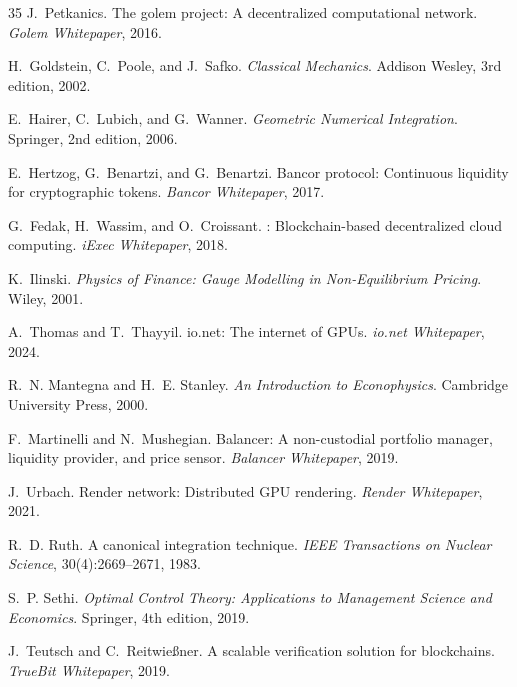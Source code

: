 \documentclass[11pt,twocolumn]{article}
\begin{document}
\begin{thebibliography}{35}
J.~Petkanics.
\newblock The golem project: A decentralized computational network.
\newblock \emph{Golem Whitepaper}, 2016.

H.~Goldstein, C.~Poole, and J.~Safko.
\newblock \emph{Classical Mechanics}.
\newblock Addison Wesley, 3rd edition, 2002.

E.~Hairer, C.~Lubich, and G.~Wanner.
\newblock \emph{Geometric Numerical Integration}.
\newblock Springer, 2nd edition, 2006.

E.~Hertzog, G.~Benartzi, and G.~Benartzi.
\newblock Bancor protocol: Continuous liquidity for cryptographic tokens.
\newblock \emph{Bancor Whitepaper}, 2017.

G.~Fedak, H.~Wassim, and O.~Croissant.
: Blockchain-based decentralized cloud computing.
\newblock \emph{iExec Whitepaper}, 2018.

K.~Ilinski.
\newblock \emph{Physics of Finance: Gauge Modelling in Non-Equilibrium Pricing}.
\newblock Wiley, 2001.

A.~Thomas and T.~Thayyil.
\newblock io.net: The internet of {GPU}s.
\newblock \emph{io.net Whitepaper}, 2024.

R.~N. Mantegna and H.~E. Stanley.
\newblock \emph{An Introduction to Econophysics}.
\newblock Cambridge University Press, 2000.

F.~Martinelli and N.~Mushegian.
\newblock Balancer: A non-custodial portfolio manager, liquidity provider, and price sensor.
\newblock \emph{Balancer Whitepaper}, 2019.

J.~Urbach.
\newblock Render network: Distributed {GPU} rendering.
\newblock \emph{Render Whitepaper}, 2021.

R.~D. Ruth.
\newblock A canonical integration technique.
\newblock \emph{IEEE Transactions on Nuclear Science}, 30(4):2669--2671, 1983.

S.~P. Sethi.
\newblock \emph{Optimal Control Theory: Applications to Management Science and Economics}.
\newblock Springer, 4th edition, 2019.

J.~Teutsch and C.~Reitwie{\ss}ner.
\newblock A scalable verification solution for blockchains.
\newblock \emph{TrueBit Whitepaper}, 2019.


\end{thebibliography}
\end{document}
